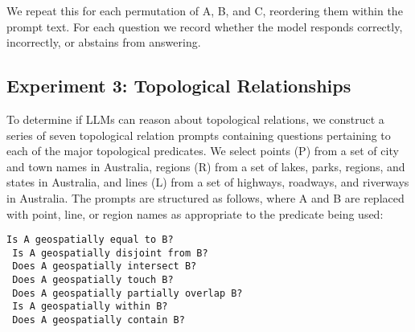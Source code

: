 \noindent We repeat this for each permutation of A, B, and C, reordering them within the prompt text.
For each question we record whether the model responds correctly, incorrectly, or abstains from answering.



\subsection{Experiment 3: Topological Relationships}
To determine if LLMs can reason about topological relations, we construct a series of seven topological relation prompts containing questions pertaining to each of the major topological predicates.
We select points (P) from a set of city and town names in Australia, regions (R) from a set of lakes, parks, regions, and states in Australia, and lines (L) from a set of highways, roadways, and riverways in Australia.
The prompts are structured as follows, where A and B are replaced with point, line, or region names as appropriate to the predicate being used:

\begin{lstlisting}[title=Prompts 5-11: Topological Relation Prompts]
 Is A geospatially equal to B?
 Is A geospatially disjoint from B?
 Does A geospatially intersect B?
 Does A geospatially touch B?
 Does A geospatially partially overlap B?
 Is A geospatially within B?
 Does A geospatially contain B?
\end{lstlisting}

